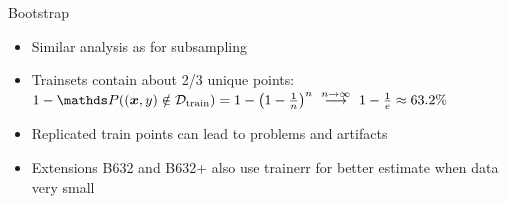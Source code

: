 \begin{vbframe}{Bootstrap}
\begin{center}
\end{center}


\begin{itemize}
  \item Similar analysis as for subsampling
  \item Trainsets contain about 2/3 unique points:
      $1 - \P((\xv, y) \notin \Dtrain) = 1 - \left(1 - \frac{1}{n}\right)^n 
  \ \stackrel{n \to \infty}{\longrightarrow} \ 1-\frac{1}{e} \approx 63.2 \%$ 
\item Replicated train points can lead to problems and artifacts
\item Extensions B632 and B632+ also use trainerr for better estimate when data very small

\end{itemize}

\end{vbframe}


